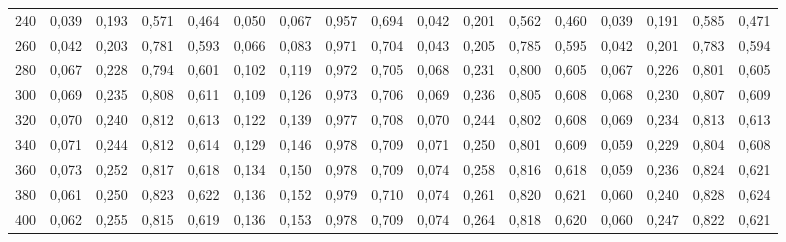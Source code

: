 \begin{table}[htb]
{\begin{tabular}{@{}rrrrrrrrrrrrrrrrr@{}}
240 & 0,039 & 0,193 & 0,571 & 0,464 & 0,050 & 0,067 & 0,957 & 0,694 & 0,042 & 0,201 & 0,562 & 0,460 & 0,039 & 0,191 & 0,585 & 0,471 \\
260 & 0,042 & 0,203 & 0,781 & 0,593 & 0,066 & 0,083 & 0,971 & 0,704 & 0,043 & 0,205 & 0,785 & 0,595 & 0,042 & 0,201 & 0,783 & 0,594 \\
280 & 0,067 & 0,228 & 0,794 & 0,601 & 0,102 & 0,119 & 0,972 & 0,705 & 0,068 & 0,231 & 0,800 & 0,605 & 0,067 & 0,226 & 0,801 & 0,605 \\
300 & 0,069 & 0,235 & 0,808 & 0,611 & 0,109 & 0,126 & 0,973 & 0,706 & 0,069 & 0,236 & 0,805 & 0,608 & 0,068 & 0,230 & 0,807 & 0,609 \\
320 & 0,070 & 0,240 & 0,812 & 0,613 & 0,122 & 0,139 & 0,977 & 0,708 & 0,070 & 0,244 & 0,802 & 0,608 & 0,069 & 0,234 & 0,813 & 0,613 \\
340 & 0,071 & 0,244 & 0,812 & 0,614 & 0,129 & 0,146 & 0,978 & 0,709 & 0,071 & 0,250 & 0,801 & 0,609 & 0,059 & 0,229 & 0,804 & 0,608 \\
360 & 0,073 & 0,252 & 0,817 & 0,618 & 0,134 & 0,150 & 0,978 & 0,709 & 0,074 & 0,258 & 0,816 & 0,618 & 0,059 & 0,236 & 0,824 & 0,621 \\
380 & 0,061 & 0,250 & 0,823 & 0,622 & 0,136 & 0,152 & 0,979 & 0,710 & 0,074 & 0,261 & 0,820 & 0,621 & 0,060 & 0,240 & 0,828 & 0,624 \\
400 & 0,062 & 0,255 & 0,815 & 0,619 & 0,136 & 0,153 & 0,978 & 0,709 & 0,074 & 0,264 & 0,818 & 0,620 & 0,060 & 0,247 & 0,822 & 0,621\\ \bottomrule
\end{tabular}%
}
\end{table}

